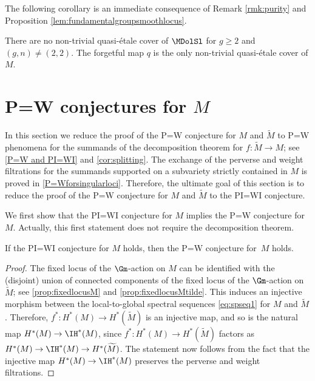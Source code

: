The following corollary is an immediate consequence of Remark \ref{rmk:purity} and Proposition \ref{lem:fundamentalgroupsmoothlocus}.

\begin{cor}
There are no non-trivial quasi-étale cover of $\MDolSl$ for $g \geq 2$ and $(g,n) \neq (2,2)$. The forgetful map $q$ is the only non-trivial quasi-étale cover of $M$.
\end{cor}
\section{P=W conjectures for \texorpdfstring{$M$}{M}}\label{sec:P=W2}

In this section we
reduce the proof of the P=W conjecture for $M$ and $\widetilde{M}$ to P=W phenomena for the summands of the decomposition theorem for $f\colon \widetilde{M} \to M$; see \cref{P=W and PI=WI} and \cref{cor:splitting}. The exchange of the perverse and weight filtrations for the summands supported on a subvariety strictly contained in $M$ is proved in \cref{P=Wforsingularloci}. Therefore, the ultimate goal of this section is to reduce the proof of the P=W conjecture for $M$ and $\widetilde{M}$ to the PI=WI conjecture.

We first show that the PI=WI conjecture for $M$ implies the P=W conjecture for~$M$. Actually, this first statement does not require the decomposition theorem.

\begin{thm}\label{P=W and PI=WI}
If the PI=WI conjecture for $M$ holds, then the P=W conjecture for~$M$ holds.
\end{thm}
\begin{proof}
The fixed locus of the $\Gm$\nobreakdash-action on $M$ can be identified with the (disjoint) union of connected components of the fixed locus of the $\Gm$\nobreakdash-action on $\widetilde{M}$; see \cref{prop:fixedlocusM} and \cref{prop:fixedlocusMtilde}. This induces an injective morphism between the local-to-global spectral sequences \eqref{eq:spseq1} for $M$ and $\widetilde{M}$. Therefore, $f^*\colon H^*(M) \to H^*(\widetilde{M})$ is an injective map, and so is the natural map $H^*(M) \to \IH^*(M)$, since $f^*\colon H^*(M) \to H^*(\widetilde{M})$ factors as $H^*(M) \to \IH^*(M) \to H^*(\widetilde{M})$. The statement now follows from the fact that the injective map $H^*(M) \to \IH^*(M)$ preserves the perverse and weight filtrations.
\end{proof}

